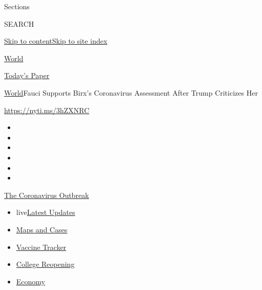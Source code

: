 Sections

SEARCH

\protect\hyperlink{site-content}{Skip to
content}\protect\hyperlink{site-index}{Skip to site index}

\href{https://www.nytimes.com/section/world}{World}

\href{https://myaccount.nytimes.com/auth/login?response_type=cookie\&client_id=vi}{}

\href{https://www.nytimes.com/section/todayspaper}{Today's Paper}

\href{/section/world}{World}\textbar{}Fauci Supports Birx's Coronavirus
Assessment After Trump Criticizes Her

\url{https://nyti.ms/3hZXNRC}

\begin{itemize}
\item
\item
\item
\item
\item
\item
\end{itemize}

\href{https://www.nytimes.com/news-event/coronavirus?action=click\&pgtype=Article\&state=default\&region=TOP_BANNER\&context=storylines_menu}{The
Coronavirus Outbreak}

\begin{itemize}
\tightlist
\item
  live\href{https://www.nytimes.com/2020/08/04/world/coronavirus-covid-19.html?action=click\&pgtype=Article\&state=default\&region=TOP_BANNER\&context=storylines_menu}{Latest
  Updates}
\item
  \href{https://www.nytimes.com/interactive/2020/us/coronavirus-us-cases.html?action=click\&pgtype=Article\&state=default\&region=TOP_BANNER\&context=storylines_menu}{Maps
  and Cases}
\item
  \href{https://www.nytimes.com/interactive/2020/science/coronavirus-vaccine-tracker.html?action=click\&pgtype=Article\&state=default\&region=TOP_BANNER\&context=storylines_menu}{Vaccine
  Tracker}
\item
  \href{https://www.nytimes.com/2020/08/02/us/covid-college-reopening.html?action=click\&pgtype=Article\&state=default\&region=TOP_BANNER\&context=storylines_menu}{College
  Reopening}
\item
  \href{https://www.nytimes.com/live/2020/08/03/business/stock-market-today-coronavirus?action=click\&pgtype=Article\&state=default\&region=TOP_BANNER\&context=storylines_menu}{Economy}
\end{itemize}

